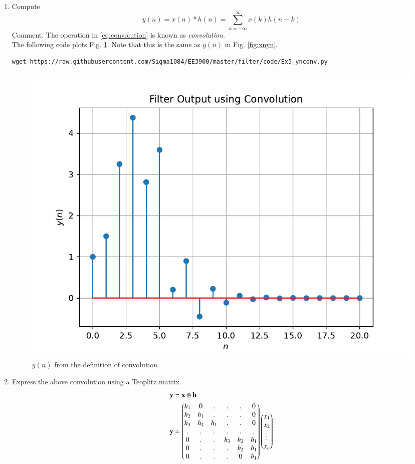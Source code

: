 \documentclass[journal,12pt,twocolumn]{IEEEtran}
\renewcommand\thesection{\arabic{section}}
\begin{document}
\begin{enumerate}[label=\thesection.\arabic*]
\item Compute 
%
\begin{equation}
\label{eq:convolution}
y(n) = x(n)*h(n) = \sum_{k=-\infty}^{\infty}x(k)h(n-k)
\end{equation}
%
Comment. The operation in \eqref{eq:convolution} is known as
{\em convolution}.
%
\\
\solution The following code plots Fig. \ref{fig:ynconv}. Note that this is the same as 
$y(n)$ in  Fig. 
\ref{fig:xnyn}. 
%
\begin{lstlisting}
wget https://raw.githubusercontent.com/Sigma1084/EE3900/master/filter/code/Ex5_ynconv.py
\end{lstlisting}
\begin{figure}[!ht]
\centering
\includegraphics[width=\columnwidth]{./figs/ynconv}
\caption{$y(n)$ from the definition of convolution}
\label{fig:ynconv}
\end{figure}

%

\item Express the above convolution using a Teoplitz matrix. \\

\solution
\begin{align*}
	\mathbf{y} &= \mathbf{x} \circledast \mathbf{h}\\
	\mathbf{y} &= 
	\begin{pmatrix}
		h_1 & 0 & . & . & . & 0 \\
		h_2 & h_1 & . & . & . & 0 \\
		h_3 & h_2 & h_1 & . & . & 0 \\
		. & . & . & . & . & . \\
		0 & . & . & h_3 & h_2 & h_1 \\
		0 & . & . & . & h_2 & h_1 \\
		0 & . & . & . & 0 & h_1
	\end{pmatrix}
	\begin{pmatrix}
		x_1 \\ x_2 \\ \vdots \\ x_n
	\end{pmatrix}
\end{align*}


\end{enumerate}
\end{document}

